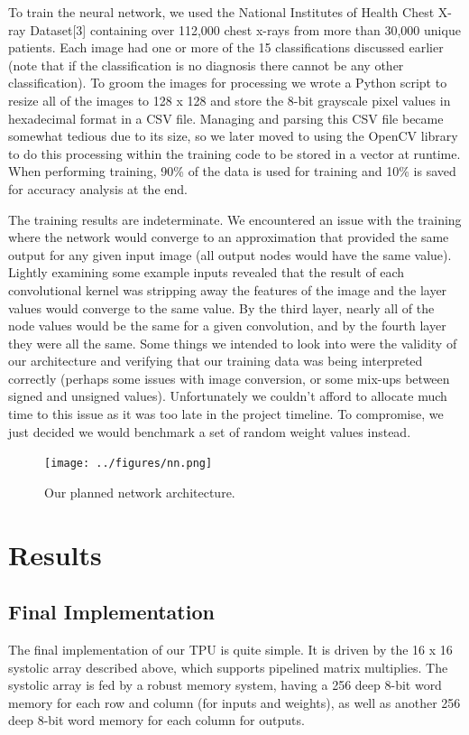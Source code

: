 \documentclass[11pt, conference, onecolumn]{IEEEtran}
\begin{document}
    To train the neural network, we used the National Institutes of Health Chest X-ray
    Dataset[3] containing over 112,000 chest x-rays from more than 30,000 unique patients.
    Each image had one or more of the 15 classifications discussed earlier (note that if
    the classification is no diagnosis there cannot be any other classification). To groom
    the images for processing we wrote a Python script to resize all of the images to
    128 x 128 and store the 8-bit grayscale pixel values in hexadecimal format in a CSV
    file. Managing and parsing this CSV file became somewhat tedious due to its size, so
    we later moved to using the OpenCV library to do this processing within the training
    code to be stored in a vector at runtime. When performing training, 90\% of the data
    is used for training and 10\% is saved for accuracy analysis at the end.

    The training results are indeterminate. We encountered an issue with the training
    where the network would converge to an approximation that provided the same output for
    any given input image (all output nodes would have the same value). Lightly examining
    some example inputs revealed that the result of each convolutional kernel was
    stripping away the features of the image and the layer values would converge to the
    same value. By the third layer, nearly all of the node values would be the same for a
    given convolution, and by the fourth layer they were all the same. Some things we
    intended to look into were the validity of our architecture and verifying that our
    training data was being interpreted correctly (perhaps some issues with image
    conversion, or some mix-ups between signed and unsigned values). Unfortunately we
    couldn’t afford to allocate much time to this issue as it was too late in the project
    timeline. To compromise, we just decided we would benchmark a set of random weight
    values instead.

    \begin{figure}[htbp]
        \centering
        \texttt{[image: ../figures/nn.png]}
        \caption{Our planned network architecture.}
    \end{figure}


\section{Results}
    \subsection{Final Implementation}
        The final implementation of our TPU is quite simple. It is driven by the 16 x 16
        systolic array described above, which supports pipelined matrix multiplies. The
        systolic array is fed by a robust memory system, having a 256 deep 8-bit word
        memory for each row and column (for inputs and weights), as well as another 256
        deep 8-bit word memory for each column for outputs.
\end{document}
